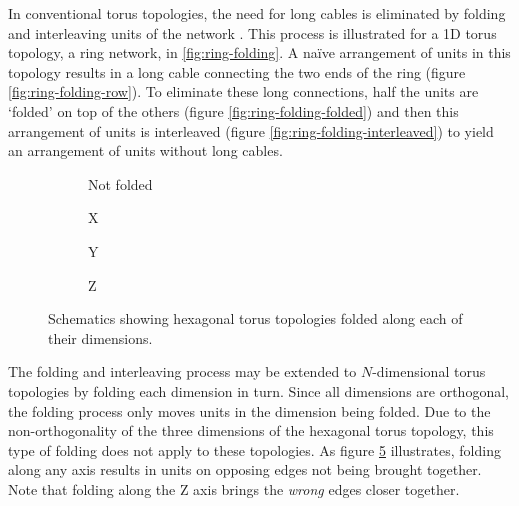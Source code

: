 		In conventional torus topologies, the need for long cables is eliminated by
		folding and interleaving units of the network \cite{dally04}. This process
		is illustrated for a 1D torus topology, a ring network, in
		\ref{fig:ring-folding}. A na\"ive arrangement of units in this topology
		results in a long cable connecting the two ends of the ring (figure
		\ref{fig:ring-folding-row}).  To eliminate these long connections, half the
		units are `folded' on top of the others (figure
		\ref{fig:ring-folding-folded}) and then this arrangement of units is
		interleaved (figure \ref{fig:ring-folding-interleaved}) to yield an
		arrangement of units without long cables.
		
		\begin{figure}
			\center
			\begin{subfigure}[b]{0.24\linewidth}
				\center
				\caption{Not folded}
				\label{fig:failing-to-fold-hex-toruses-none}
			\end{subfigure}
			\begin{subfigure}[b]{0.24\linewidth}
				\center
				\caption{X}
				\label{fig:failing-to-fold-hex-toruses-x}
			\end{subfigure}
			\begin{subfigure}[b]{0.24\linewidth}
				\center
				\caption{Y}
				\label{fig:failing-to-fold-hex-toruses-y}
			\end{subfigure}
			\begin{subfigure}[b]{0.24\linewidth}
				\center
				\caption{Z}
				\label{fig:failing-to-fold-hex-toruses-z}
			\end{subfigure}
			
			\caption{Schematics showing hexagonal torus topologies folded along
			each of their dimensions.}
			\label{fig:failing-to-fold-hex-toruses}
		\end{figure}
		
		The folding and interleaving process may be extended to $N$-dimensional
		torus topologies by folding each dimension in turn. Since all dimensions
		are orthogonal, the folding process only moves units in the dimension being
		folded. Due to the non-orthogonality of the three dimensions of the
		hexagonal torus topology, this type of folding does not apply to these
		topologies. As figure \ref{fig:failing-to-fold-hex-toruses} illustrates,
		folding along any axis results in units on opposing edges not being brought
		together. Note that folding along the Z axis brings the \emph{wrong} edges
		closer together.
	

